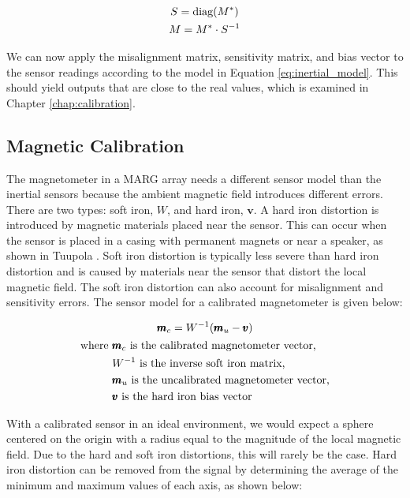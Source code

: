\begin{gather} \labeq{sensitivity_and_misalignment}
    S = \text{diag}(M^*) \\
    M = M^* \cdot S^{-1} \notag
\end{gather}

We can now apply the misalignment matrix, sensitivity matrix, and bias vector to the sensor readings according to the model in Equation \ref{eq:inertial_model}. 
This should yield outputs that are close to the real values, which is examined in Chapter \ref{chap:calibration}.

\subsection{Magnetic Calibration}
The magnetometer in a MARG array needs a different sensor model than the inertial sensors because the ambient magnetic field introduces different errors. 
There are two types: soft iron, $W$, and hard iron, $\pmb{v}$. 
A hard iron distortion is introduced by magnetic materials placed near the sensor. 
This can occur when the sensor is placed in a casing with permanent magnets or near a speaker, as shown in Tuupola \cite{Tuupola:2018}. 
Soft iron distortion is typically less severe than hard iron distortion and is caused by materials near the sensor that distort the local magnetic field. 
The soft iron distortion can also account for misalignment and sensitivity errors. 
The sensor model for a calibrated magnetometer is given below:

\begin{gather} \labeq{magnetic_model}
    \pmb{m}_c=W^{-1}(\pmb{m}_u-\pmb{v}) \\
    \begin{aligned}
        \text{where } &\pmb{m}_c \text{ is the calibrated magnetometer vector,} \\
        &W^{-1} \text{ is the inverse soft iron matrix,}\\
        &\pmb{m}_u \text{ is the uncalibrated magnetometer vector,} \\
        &\pmb{v} \text{ is the hard iron bias vector}
    \end{aligned} \notag
\end{gather}

With a calibrated sensor in an ideal environment, we would expect a sphere centered on the origin with a radius equal to the magnitude of the local magnetic field. 
Due to the hard and soft iron distortions, this will rarely be the case. 
Hard iron distortion can be removed from the signal by determining the average of the minimum and maximum values of each axis, as shown below:

